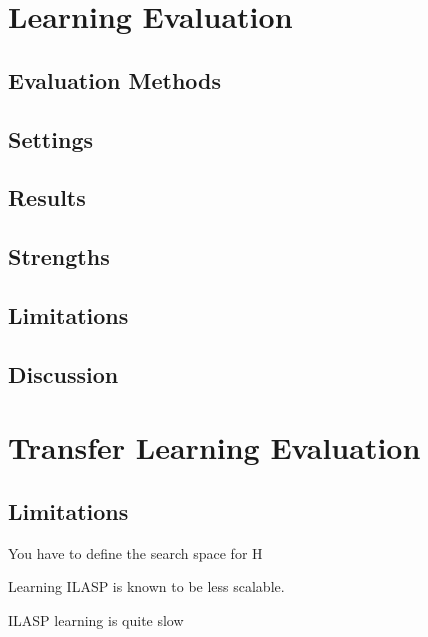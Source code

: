 \section{Learning Evaluation}
\label{learning_evaluation}

\subsection{Evaluation Methods}

\subsection{Settings}

\subsection{Results}

\subsection{Strengths}

\subsection{Limitations}

\subsection{Discussion}

\section{Transfer Learning Evaluation}
\label{transfer_learning}

\subsection{Limitations}

You have to define the search space for H

Learning ILASP is known to be less scalable. 

ILASP learning is quite slow
